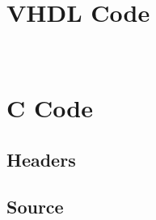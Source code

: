 \documentclass[10pt,a4paper]{article}
\begin{document}
	\section{\\VHDL Code}
	
	
	\section{\\C Code}
	\subsection{Headers}
	
	
	\subsection{Source}
	
\end{document}

